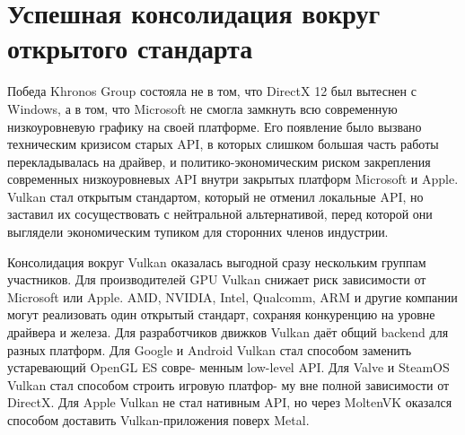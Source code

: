\documentclass[12pt,a4paper]{article}
\begin{document}
\section{Успешная консолидация вокруг открытого стандарта}

Победа Khronos Group состояла не в том, что DirectX 12 был вытеснен с Windows, а в
том, что Microsoft не смогла замкнуть всю современную низкоуровневую графику на своей
платформе. Его появление было вызвано техническим кризисом
старых API, в которых слишком большая часть работы перекладывалась на драйвер, и
политико-экономическим риском закрепления современных низкоуровневых API внутри
закрытых платформ Microsoft и Apple. Vulkan стал открытым стандартом, который не отменил 
локальные API, но заставил их
сосуществовать с нейтральной альтернативой, перед которой они выглядели экономическим 
тупиком для сторонних членов индустрии.

Консолидация вокруг Vulkan оказалась выгодной сразу нескольким группам участников.
Для производителей GPU Vulkan снижает риск зависимости от Microsoft или Apple.
AMD, NVIDIA, Intel, Qualcomm, ARM и другие компании могут реализовать один открытый
стандарт, сохраняя конкуренцию на уровне драйвера и железа.
Для разработчиков движков Vulkan даёт общий backend для разных платформ. 
Для Google и Android Vulkan стал способом заменить устаревающий OpenGL ES совре-
менным low-level API. Для Valve и SteamOS Vulkan стал способом строить игровую платфор-
му вне полной зависимости от DirectX. Для Apple Vulkan не стал нативным API, но через
MoltenVK оказался способом доставить Vulkan-приложения поверх Metal.

\end{document}
